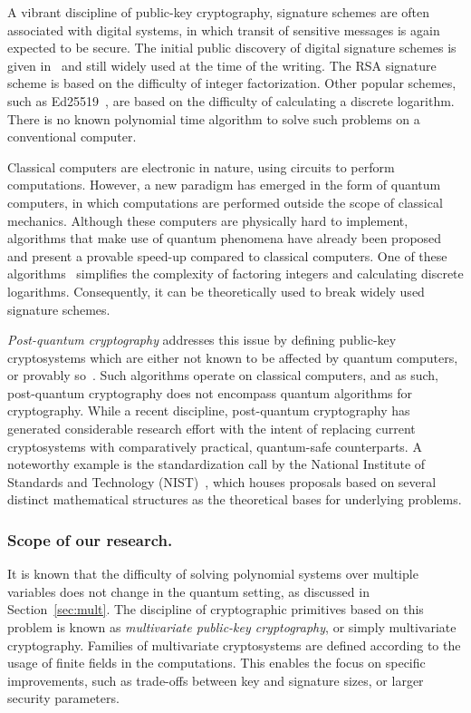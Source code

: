 \documentclass[12pt, a4paper, oneside]{memoir}
\theoremstyle{definition}
\begin{document}
A vibrant discipline of public-key cryptography, signature schemes are often associated with digital systems, in which transit of sensitive messages is again expected to be secure. The initial public discovery of digital signature schemes is given in~\cite{Rivest:197802} and still widely used at the time of the writing. The RSA signature scheme is based on the difficulty of integer factorization. Other popular schemes, such as Ed25519~\cite{Bernstein:201208}, are based on the difficulty of calculating a discrete logarithm. There is no known polynomial time algorithm to solve such problems on a conventional computer.

Classical computers are electronic in nature, using circuits to perform computations. However, a new paradigm has emerged in the form of quantum computers, in which computations are performed outside the scope of classical mechanics. Although these computers are physically hard to implement, algorithms that make use of quantum phenomena have already been proposed and present a provable speed-up compared to classical computers. One of these algorithms~\cite{Shor:199710} simplifies the complexity
of factoring integers and calculating discrete logarithms. Consequently, it can be theoretically used to break widely used signature schemes.

\emph{Post-quantum cryptography} addresses this issue by defining public-key cryptosystems which are either not known to be affected by quantum computers, or provably so~\cite{Bernstein:2008}. Such algorithms operate on classical computers, and as such, post-quantum cryptography does not encompass quantum algorithms for cryptography. While a recent discipline, post-quantum cryptography has generated considerable research effort with the intent of replacing current cryptosystems with comparatively practical, quantum-safe counterparts. A noteworthy example is the standardization call by the National Institute of Standards and Technology (NIST)~\cite{Alagic:201901,Alagic:202007}, which houses proposals based on several distinct mathematical structures as the theoretical bases for underlying problems.

\subsubsection{Scope of our research.}

It is known that the difficulty of solving polynomial systems over multiple variables does not change in the quantum setting, as discussed in Section~\ref{sec:mult}. The discipline of cryptographic primitives based on this problem is known as \textit{multivariate public-key cryptography}, or simply multivariate cryptography. Families of multivariate cryptosystems are defined according to the usage of finite fields in the computations. This enables the focus on specific improvements, such as trade-offs between key and signature sizes, or larger security parameters.
\end{document}
